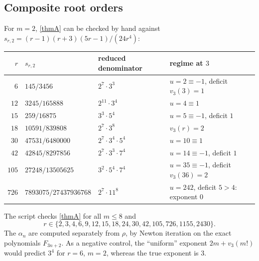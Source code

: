 \documentclass[11pt,reqno]{amsart}
\theoremstyle{definition}
\theoremstyle{remark}
\theoremstyle{plain}
\begin{document}
\subsection{Composite root orders} For $m=2$, \cref{thmA} can be checked by hand against $s_{r,2}=(r-1)(r+3)(5r-1)/(24r^4)$:
\begin{center}
\begin{tabular}{@{}rlll@{}}
\toprule
$r$ & $s_{r,2}$ & reduced denominator & regime at $3$\\
\midrule
$6$ & $145/3456$ & $2^7\cdot3^3$ & $u=2\equiv-1$, deficit $v_3(3)=1$\\
$12$ & $3245/165888$ & $2^{11}\cdot3^4$ & $u=4\equiv1$\\
$15$ & $259/16875$ & $3^3\cdot5^4$ & $u=5\equiv-1$, deficit $1$\\
$18$ & $10591/839808$ & $2^7\cdot3^8$ & $v_3(r)=2$\\
$30$ & $47531/6480000$ & $2^7\cdot3^4\cdot5^4$ & $u=10\equiv1$\\
$42$ & $42845/8297856$ & $2^7\cdot3^3\cdot7^4$ & $u=14\equiv-1$, deficit $1$\\
$105$ & $27248/13505625$ & $3^2\cdot5^4\cdot7^4$ & $u=35\equiv-1$, deficit $v_3(36)=2$\\
$726$ & $7893075/27437936768$ & $2^7\cdot11^8$ & $u=242$, deficit $5>4$: exponent $0$\\
\bottomrule
\end{tabular}
\end{center}
The script checks \cref{thmA} for all $m\le8$ and
\[
r\in\{2,3,4,6,9,12,15,18,24,30,42,105,726,1155,2430\}.
\] The $\alpha_n$ are computed separately from $\rho$, by Newton iteration on the exact polynomials $F_{3n+2}$. As a negative control, the ``uniform'' exponent $2m+v_3(m!)$ would predict $3^4$ for $r=6$, $m=2$, whereas the true exponent is $3$.
\end{document}
